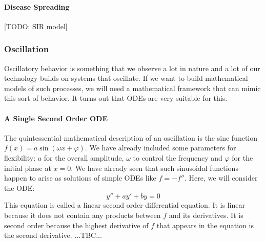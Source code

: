 \paragraph{Disease Spreading} [TODO: SIR model]




\subsubsection{Oscillation}
Oscillatory behavior is something that we observe a lot in nature and a lot of our technology builds on systems that oscillate. If we want to build mathematical models of such processes, we will need a mathematical framework that can mimic this sort of behavior. It turns out that ODEs are very suitable for this.

\paragraph{A Single Second Order ODE}
The quintessential mathematical description of an oscillation is the sine function $f(x) = a \sin(\omega x + \varphi)$. We have already included some parameters for flexibility: $a$ for the overall amplitude, $\omega$ to control the frequency and $\varphi$ for the initial phase at $x=0$. We have already seen that such sinusoidal functions happen to arise as solutions of simple ODEs like $f = -f''$. Here, we will consider the ODE:
\begin{equation}
 y'' + a y' + b y = 0
\end{equation}
This equation is called a linear second order differential equation. It is linear because it does not contain any products between $f$ and its derivatives. It is second order because the highest derivative of $f$ that appears in the equation is the second derivative. ...TBC...





